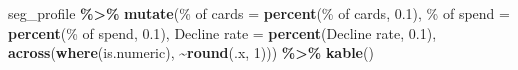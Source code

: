 \documentclass[
]{article}
\newenvironment{Shaded}{\begin{snugshade}}{\end{snugshade}}
\newcommand{\AttributeTok}[1]{\textcolor[rgb]{0.13,0.29,0.53}{#1}}
\newcommand{\DecValTok}[1]{\textcolor[rgb]{0.00,0.00,0.81}{#1}}
\newcommand{\FloatTok}[1]{\textcolor[rgb]{0.00,0.00,0.81}{#1}}
\newcommand{\FunctionTok}[1]{\textcolor[rgb]{0.13,0.29,0.53}{\textbf{#1}}}
\newcommand{\NormalTok}[1]{#1}
\newcommand{\OtherTok}[1]{\textcolor[rgb]{0.56,0.35,0.01}{#1}}
\newcommand{\SpecialCharTok}[1]{\textcolor[rgb]{0.81,0.36,0.00}{\textbf{#1}}}
\newcommand{\StringTok}[1]{\textcolor[rgb]{0.31,0.60,0.02}{#1}}
\begin{document}
\begin{Shaded}
\begin{Highlighting}[]
\NormalTok{seg\_profile }\SpecialCharTok{\%\textgreater{}\%}
  \FunctionTok{mutate}\NormalTok{(}\StringTok{\textasciigrave{}}\AttributeTok{\% of cards}\StringTok{\textasciigrave{}} \OtherTok{=} \FunctionTok{percent}\NormalTok{(}\StringTok{\textasciigrave{}}\AttributeTok{\% of cards}\StringTok{\textasciigrave{}}\NormalTok{, }\FloatTok{0.1}\NormalTok{),}
         \StringTok{\textasciigrave{}}\AttributeTok{\% of spend}\StringTok{\textasciigrave{}} \OtherTok{=} \FunctionTok{percent}\NormalTok{(}\StringTok{\textasciigrave{}}\AttributeTok{\% of spend}\StringTok{\textasciigrave{}}\NormalTok{, }\FloatTok{0.1}\NormalTok{),}
         \StringTok{\textasciigrave{}}\AttributeTok{Decline rate}\StringTok{\textasciigrave{}} \OtherTok{=} \FunctionTok{percent}\NormalTok{(}\StringTok{\textasciigrave{}}\AttributeTok{Decline rate}\StringTok{\textasciigrave{}}\NormalTok{, }\FloatTok{0.1}\NormalTok{),}
         \FunctionTok{across}\NormalTok{(}\FunctionTok{where}\NormalTok{(is.numeric), }\SpecialCharTok{\textasciitilde{}}\FunctionTok{round}\NormalTok{(.x, }\DecValTok{1}\NormalTok{))) }\SpecialCharTok{\%\textgreater{}\%} \FunctionTok{kable}\NormalTok{()}
\end{Highlighting}
\end{Shaded}
\end{document}
